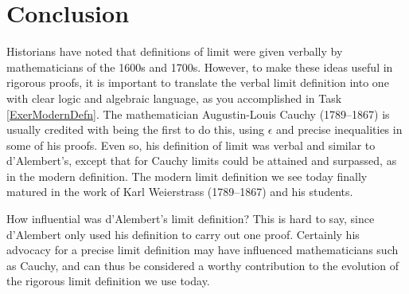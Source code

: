 \documentclass[11pt]{article}%
\begin{document}
\section{Conclusion}

Historians have noted that definitions of limit were given verbally by
mathematicians of the 1600s and 1700s. However, to make these ideas useful in
rigorous proofs, it is important to translate the verbal limit definition into
one with clear logic and algebraic language, as you accomplished in Task
\ref{ExerModernDefn}. The mathematician Augustin-Louis Cauchy (1789--1867) is
usually credited with being the first to do this, using $\epsilon$ and precise
inequalities in some of his proofs. Even so, his definition of limit was
verbal and similar to d'Alembert's, except that for Cauchy limits could be attained
and surpassed, as in the modern
definition. The modern limit definition we see today finally matured in the
work of Karl Weierstrass (1789--1867) and his students.

How influential was d'Alembert's limit definition? This is hard to say, since
d'Alembert only used his definition to carry out one proof. Certainly his
advocacy for a precise limit definition may have influenced mathematicians such
as Cauchy, and can thus be considered a worthy contribution to the evolution
of the rigorous limit definition we use today.

\medskip

\nocite{*}


{}





\end{document}
